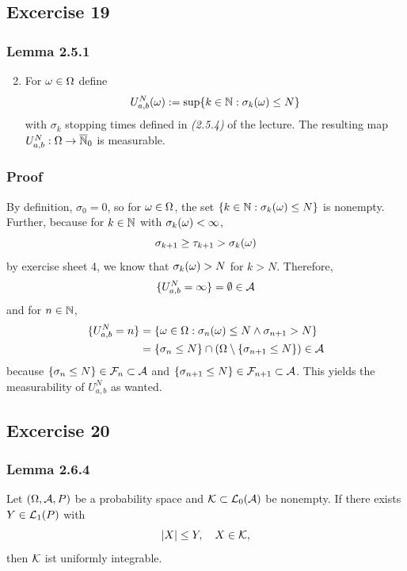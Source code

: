 \documentclass[12pt]{scrartcl}
\date{\today}
\begin{document}
\subsection*{Excercise 19}
\subsubsection*{Lemma 2.5.1}

\begin{enumerate}[$i)$]
	\setcounter{enumi}{1}
	\item For $\omega\in\Omega$ define 
	$$U_{a,b}^N(\omega):=\sup\{k\in\mathbb{N}:\sigma_k(\omega)\le N\}$$
	with $\sigma_k$ stopping times defined in \textit{(2.5.4)} of the lecture. The resulting map $U_{a,b}^N: \Omega\rightarrow\overline{\mathbb{N}}_0$ is measurable.
\end{enumerate}

\subsubsection*{Proof}
\einruecken

By definition, $\sigma_0=0$, so for $\omega\in\Omega$, the set $\{k\in\mathbb{N}:\sigma_k(\omega)\le N\}$ is nonempty. Further, because for $k\in\mathbb{N}$ with $\sigma_k(\omega)<\infty$,
$$\sigma_{k+1}\ge\tau_{k+1}>\sigma_k(\omega)$$
by exercise sheet 4, we know that $\sigma_k(\omega)> N$ for $k> N$.
Therefore,
$$\{U_{a,b}^N=\infty\}=\emptyset\in\mathcal{A}$$
and for $n\in\mathbb{N}$,
\begin{align*}
\{U_{a,b}^N=n\}
&= \{\omega\in\Omega:\sigma_n(\omega)\le N\land\sigma_{n+1}>N\} \\
&= \{\sigma_n\le N\}\cap(\Omega\setminus\{\sigma_{n+1}\le N\}) \in \mathcal{A}
\end{align*}
because $\{\sigma_n\le N\}\in\mathcal{F}_n\subset\mathcal{A}$ and $\{\sigma_{n+1}\le N\}\in\mathcal{F}_{n+1}\subset\mathcal{A}$.
This yields the measurability of $U_{a,b}^N$ as wanted.
 

\ausruecken

\subsection*{Excercise 20}
\subsubsection*{Lemma 2.6.4}

Let $(\Omega,\mathcal{A},P)$ be a probability space and $\mathcal{K}\subset\mathcal{L}_0(\mathcal{A})$ be nonempty. If there exists $Y\in\mathcal{L}_1(P)$ with
$$|X|\le Y,\quad X\in\mathcal{K},$$
then $\mathcal{K}$ ist uniformly integrable.
\end{document}
